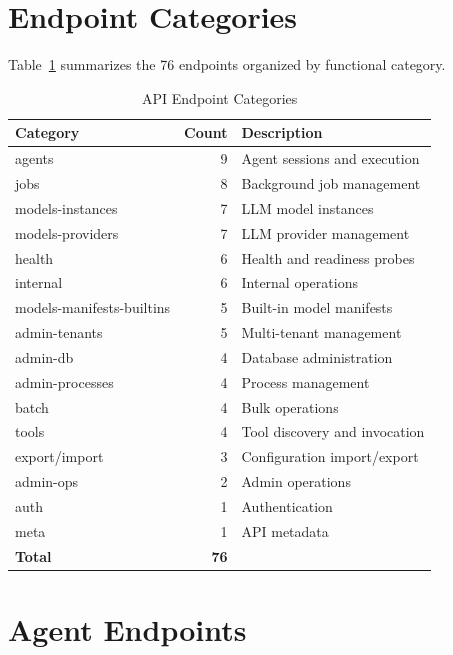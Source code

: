 \documentclass[a4paper,twoside]{sapthesis}
\begin{document}
\section{Endpoint Categories}
\label{app:api:categories}

Table~\ref{tab:endpoint-categories} summarizes the 76 endpoints organized by functional category.

\begin{table}[ht]
\centering
\caption{API Endpoint Categories}
\label{tab:endpoint-categories}
\small
\begin{tabularx}{\textwidth}{lrX}
    \hline
    \textbf{Category} & \textbf{Count} & \textbf{Description} \\
    \hline
    agents & 9 & Agent sessions and execution \\
    jobs & 8 & Background job management \\
    models-instances & 7 & LLM model instances \\
    models-providers & 7 & LLM provider management \\
    health & 6 & Health and readiness probes \\
    internal & 6 & Internal operations \\
    models-manifests-builtins & 5 & Built-in model manifests \\
    admin-tenants & 5 & Multi-tenant management \\
    admin-db & 4 & Database administration \\
    admin-processes & 4 & Process management \\
    batch & 4 & Bulk operations \\
    tools & 4 & Tool discovery and invocation \\
    export/import & 3 & Configuration import/export \\
    admin-ops & 2 & Admin operations \\
    auth & 1 & Authentication \\
    meta & 1 & API metadata \\
    \hline
    \textbf{Total} & \textbf{76} & \\
    \hline
\end{tabularx}
\end{table}

\section{Agent Endpoints}
\label{app:api:agents}
\end{document}
